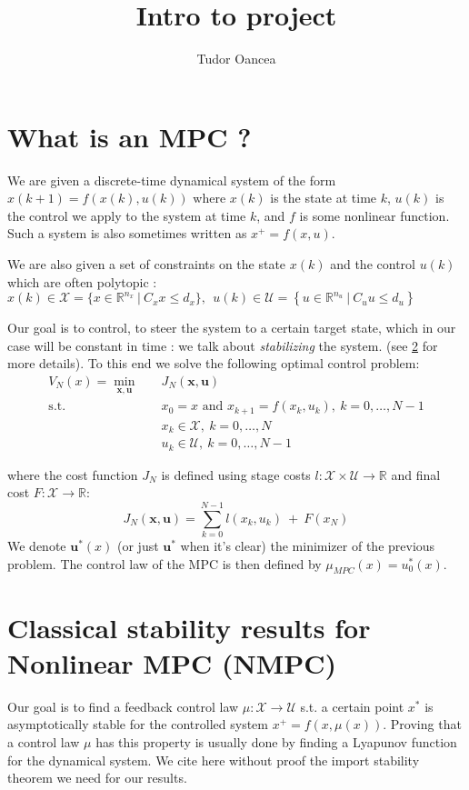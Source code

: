 \documentclass[12pt]{article}
\title{Intro to project}
\author{Tudor Oancea}
\date{}
\numberwithin{theorem}{section} %
\theoremstyle{definition}
\theoremstyle{remark}
\def\cal#1{\mathcal{#1}}
\newcommand{\R}{\mathbb{R}}
\begin{document}
\maketitle
\section{What is an MPC ?}
We are given a discrete-time dynamical system of the form $x(k+1)=f(x(k),u(k))$
where $x(k)$ is the state at time $k$, $u(k)$ is the control we apply to the system at time $k$, and $f$ is some nonlinear function.
Such a system is also sometimes written as $x^+=f(x,u)$.

We are also given a set of constraints on the state $x(k)$ and the control $u(k)$ which are often polytopic : $x(k)\in\cal{X}=\{x\in\R^{n_x}~|~C_xx\leq d_x\},~~u(k)\in\cal{U}=\left\{u\in\R^{n_u}~|~C_uu\leq d_u\right\}$

Our goal is to control, to steer the system to a certain target state, which in our case will be constant in time : we talk about \textit{stabilizing} the system.
(see \ref{stability-NMPC} for more details).
To this end we solve the following optimal control problem:
\begin{align*}\label{NMPC}
	V_N(x)=\underset{\mathbf{x},\mathbf{u}}{\min} &\quad J_N(\mathbf{x},\mathbf{u})\\
	\text{s.t.} &\quad x_0=x\text{ and }x_{k+1}=f(x_k,u_k),~k=0,\dots,N-1\\
	&\quad x_k\in\cal{X},~k=0,\dots,N\\
	&\quad u_k\in\cal{U},~k=0,\dots,N-1
\end{align*}

where the cost function $J_N$ is defined using stage costs $l:\cal{X}\times\cal{U}\to\R$ and final cost $F:\cal{X}\to\R$:
$$J_N(\mathbf{x},\mathbf{u})=\sum_{k=0}^{N-1}l(x_k,u_k)~+~F(x_N)$$
We denote $\mathbf{u}^*(x)$ (or just $\mathbf{u}^*$ when it's clear) the minimizer of the previous problem.
The control law of the MPC is then defined by $\mu_{MPC}(x)=u^*_0(x)$.

\section{Classical stability results for Nonlinear MPC (NMPC)}
\label{stability-NMPC}
Our goal is to find a feedback control law $\mu:\cal{X}\to\cal{U}$ s.t. a certain point $x^*$ is asymptotically stable for the controlled system $x^+=f(x,\mu(x))$.
Proving that a control law $\mu$ has this property is usually done by finding a Lyapunov function for the dynamical system.
We cite here without proof the import stability theorem we need for our results.
\end{document}

